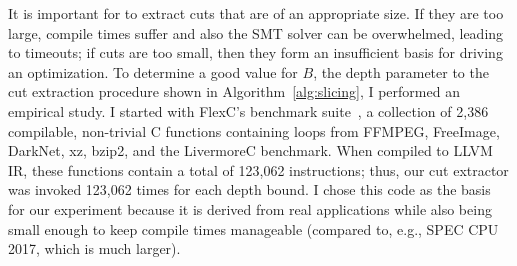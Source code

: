 It is important for \minotaur{} to extract cuts that are of an appropriate
size.
%
If they are too large, compile times suffer and also the SMT solver
can be overwhelmed, leading to timeouts; if cuts are too small, then
they form an insufficient basis for driving an optimization.
%
To determine a good value for $B$, the depth parameter to the cut
extraction procedure shown in Algorithm~\ref{alg:slicing}, I
performed an empirical study.
%
I started with FlexC's benchmark suite~\cite{woodruff2023rewriting},
a collection of 2,386 compilable, non-trivial C functions containing
loops from FFMPEG, FreeImage, DarkNet, xz, bzip2, and the LivermoreC
benchmark.
%
When compiled to LLVM IR, these functions contain a total of 123,062
instructions; thus, our cut extractor was invoked 123,062 times for
each depth bound.
%
I chose this code as the basis for our experiment because it is
derived from real applications while also being small enough to
keep compile times manageable (compared to, e.g., SPEC CPU 2017,
which is much larger).


